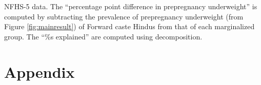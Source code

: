 \documentclass[12pt]{article}
\begin{document}
\begin{landscape}

\begin{table}[H]
    \centering

    \begin{threeparttable}
        
    
    \small %
    \caption{: Decomposition of social group differences in the prevalence of prepregnancy underweight}
    \label{decomposition}
    \renewcommand{\arraystretch}{1.5}
    {}

    \begin{tablenotes}
        \item NFHS-5 data.  The ``percentage point difference in prepregnancy underweight'' is computed by subtracting the prevalence of prepregnancy underweight (from Figure \ref{fig:mainresult}) of Forward caste Hindus from that of each marginalized group. The ``\%s explained'' are computed using \cite{kitagawa1955components} decomposition. 
    \end{tablenotes}

    \end{threeparttable}
\end{table}

\end{landscape}









\newpage
\clearpage
\appendix

\section*{Appendix}



\setcounter{section}{-1}
\renewcommand{\thesection}{S.\arabic{section}}
\renewcommand{\thesubsection}{S.\arabic{section}.\arabic{subsection}}

\setcounter{table}{0}
\renewcommand{\thetable}{A\arabic{table}}
\setcounter{figure}{0}
\renewcommand{\thefigure}{A\arabic{figure}}

\end{document}
